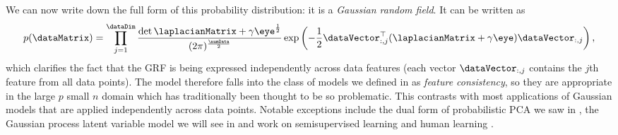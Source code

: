 We can now write down the full form of this probability distribution:
it is a \emph{Gaussian random field}. It can be written as
\[ 
p(\dataMatrix) = \prod_{j=1}^\dataDim\frac{\det{\laplacianMatrix +
    \gamma\eye}^{\frac{1}{2}}}{(2\pi)^{\frac{\numData}{2}}}
\exp\left(-\frac{1}{2}\dataVector_{:,j}^\top(\laplacianMatrix +
  \gamma\eye)\dataVector_{:, j}\right),
\]
which clarifies the fact that the GRF is being expressed independently
across data features (each vector $\dataVector_{:,j}$ contains the
$j$th feature from all data points).  The model therefore falls into
the class of models we defined in  as
\emph{feature consistency}, so they are appropriate in the large $p$
small $n$ domain which has traditionally been thought to be so
problematic. This contrasts with most applications of Gaussian models
that are applied independently across data points. Notable exceptions
include the dual form of probabilistic PCA we saw in , the
Gaussian process latent variable model we will see in  and
work on semisupervised learning \citep{Zhu:graphsemi03} and human
learning \citep{Kemp:form08}. 

